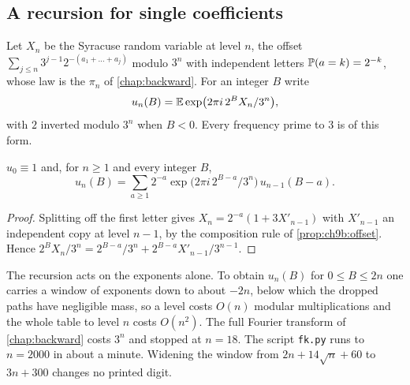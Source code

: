 \subsection{A recursion for single coefficients}
Let $X_n$ be the Syracuse random variable at level $n$, the offset $\sum_{j\le n}3^{j-1}2^{-(a_1+\dots+a_j)}$ modulo $3^n$ with independent letters $\mathbb{P}(a=k)=2^{-k}$, whose law is the $\pi_n$ of \cref{chap:backward}. For an integer $B$ write
\[
u_n(B)=\mathbb{E}\exp\bigl(2\pi i\,2^{B}X_n/3^n\bigr),
\]
with $2$ inverted modulo $3^n$ when $B<0$. Every frequency prime to $3$ is of this form.

\begin{proposition}\label{rrt:prop:fk}
$u_0\equiv1$ and, for $n\ge1$ and every integer $B$,
\[
u_n(B)=\sum_{a\ge1}2^{-a}\exp\bigl(2\pi i\,2^{B-a}/3^n\bigr)\,u_{n-1}(B-a).
\]
\end{proposition}

\begin{proof}
Splitting off the first letter gives $X_n=2^{-a}(1+3X'_{n-1})$ with $X'_{n-1}$ an independent copy at level $n-1$, by the composition rule of \cref{prop:ch9b:offset}. Hence $2^BX_n/3^n=2^{B-a}/3^n+2^{B-a}X'_{n-1}/3^{n-1}$.
\end{proof}

The recursion acts on the exponents alone. To obtain $u_n(B)$ for $0\le B\le 2n$ one carries a window of exponents down to about $-2n$, below which the dropped paths have negligible mass, so a level costs $O(n)$ modular multiplications and the whole table to level $n$ costs $O(n^2)$. The full Fourier transform of \cref{chap:backward} costs $3^n$ and stopped at $n=18$. The script \texttt{fk.py} runs to $n=2000$ in about a minute. Widening the window from $2n+14\sqrt n+60$ to $3n+300$ changes no printed digit.

